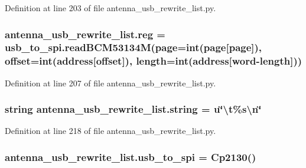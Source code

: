 Definition at line 203 of file antenna\+\_\+usb\+\_\+rewrite\+\_\+list.\+py.

\subsubsection[{\texorpdfstring{reg}{reg}}]{\setlength{\rightskip}{0pt plus 5cm}antenna\+\_\+usb\+\_\+rewrite\+\_\+list.\+reg = usb\+\_\+to\+\_\+spi.\+read\+B\+C\+M53134M(page=int(page\mbox{[}\textquotesingle{}page\textquotesingle{}\mbox{]}), offset=int(address\mbox{[}\textquotesingle{}offset\textquotesingle{}\mbox{]}), {\bf length}=int(address\mbox{[}\textquotesingle{}word-\/{\bf length}\textquotesingle{}\mbox{]}))}\hypertarget{namespaceantenna__usb__rewrite__list_a4f8d71b5c1ed3ecaf8af418184761254}{}\label{namespaceantenna__usb__rewrite__list_a4f8d71b5c1ed3ecaf8af418184761254}


Definition at line 207 of file antenna\+\_\+usb\+\_\+rewrite\+\_\+list.\+py.

\subsubsection[{\texorpdfstring{string}{string}}]{\setlength{\rightskip}{0pt plus 5cm}string antenna\+\_\+usb\+\_\+rewrite\+\_\+list.\+string = u\char`\"{}\textbackslash{}t\%s\textbackslash{}n\char`\"{}}\hypertarget{namespaceantenna__usb__rewrite__list_ab939ab5ad6fd12b022e0bc9ded4ccb7c}{}\label{namespaceantenna__usb__rewrite__list_ab939ab5ad6fd12b022e0bc9ded4ccb7c}


Definition at line 218 of file antenna\+\_\+usb\+\_\+rewrite\+\_\+list.\+py.

\subsubsection[{\texorpdfstring{usb\+\_\+to\+\_\+spi}{usb_to_spi}}]{\setlength{\rightskip}{0pt plus 5cm}antenna\+\_\+usb\+\_\+rewrite\+\_\+list.\+usb\+\_\+to\+\_\+spi = {\bf Cp2130}()}\hypertarget{namespaceantenna__usb__rewrite__list_a3d824bc3a35be052f6e7107422536634}{}\label{namespaceantenna__usb__rewrite__list_a3d824bc3a35be052f6e7107422536634}


